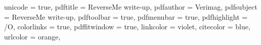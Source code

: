 
\usepackage[utf8]{inputenc}
\usepackage[T1]{fontenc}







\usepackage[titletoc]{appendix}

\usepackage{csquotes}

\usepackage[sorting=anyt,sortcites=true,backend=biber,url=false,doi=false,maxnames=7,isbn=false,firstinits=true,style=numeric]{biblatex}
% 




\usepackage[english]{babel}

\usepackage{braket}
\usepackage{amsmath,amssymb,mathtools,amsthm}
\usepackage{nicefrac}
\usepackage{stmaryrd}
\usepackage{xfrac}


\usepackage{algorithm2e}
\SetAlFnt{\small}

\usepackage{hyperref}
\hypersetup
{
  unicode         = true,
  pdftitle        = ReverseMe write-up,
  pdfauthor       = Verimag, %
  pdfsubject      = ReverseMe write-up,
  pdftoolbar      = true, %
  pdfmenubar      = true, %
  pdfhighlight    = /O, %
  colorlinks      = true, %
  pdffitwindow    = true, %
  linkcolor       = violet, %
  citecolor       = blue, %
  urlcolor        = orange, %
}

